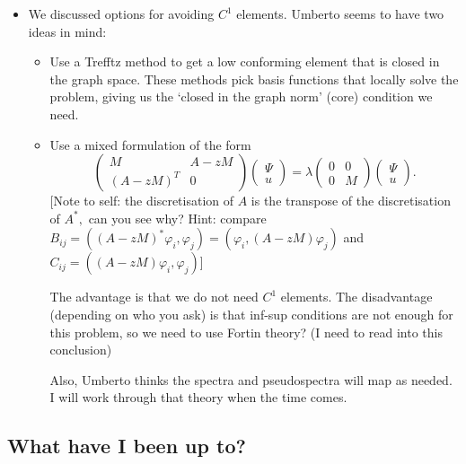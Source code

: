 \documentclass[12pt,a4paper]{article}
\begin{document}
\begin{itemize}
    \item We discussed options for avoiding $C^1$ elements. Umberto seems to have two ideas in mind:
    \begin{itemize}
        \item Use a Trefftz method to get a low conforming element that is closed in the graph space. These methods pick basis functions that locally solve the problem, giving us the `closed in the graph norm' (core) condition we need. 
        \item Use a mixed formulation of the form 
        \begin{equation}
            \begin{pmatrix}
        M & A-zM \\
        (A-zM)^T & 0
        \end{pmatrix}
        \begin{pmatrix}
        \Psi \\
        u
        \end{pmatrix}
        =
        \lambda
        \begin{pmatrix}
        0 & 0 \\
        0 & M
        \end{pmatrix}
        \begin{pmatrix}
        \Psi \\
        u
        \end{pmatrix}.
        \end{equation}
        [Note to self: the discretisation of $A$ is the transpose of the discretisation of $A^*,$ can you see why? Hint: compare $B_{ij} = ((A-zM)^* \varphi_i, \varphi_j) = (\varphi_i, (A-zM) \varphi_j)$ and $C_{ij} = ((A-zM)\varphi_i, \varphi_j)$]
        
        The advantage is that we do not need $C^1$ elements. The disadvantage (depending on who you ask) is that inf-sup conditions are not enough for this problem, so we need to use Fortin theory? (I need to read into this conclusion)
        
        Also, Umberto thinks the spectra and pseudospectra will map as needed. I will work through that theory when the time comes. 
    \end{itemize}
\end{itemize}

\subsection{What have I been up to?}
\end{document}
